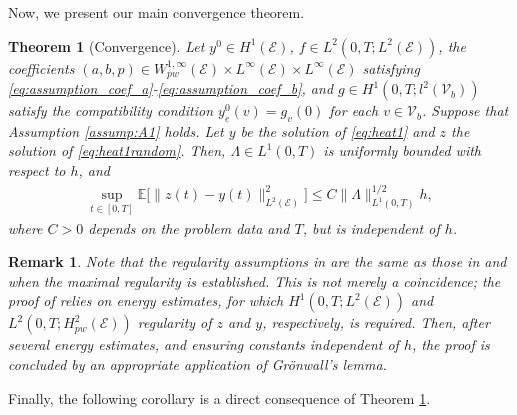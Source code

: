 \documentclass[a4paper, 10pt, english]{article}
\newtheorem{theorem}{Theorem}[section]
\newtheorem{remark}{Remark}[section]
\begin{document}
Now, we present our main convergence theorem.

\begin{theorem}[Convergence]\label{th:convergence}
Let $y^0 \in H^1(\mathcal{E})$, $f \in L^2(0, T; L^2(\mathcal{E}))$, the coefficients $(a, b, p) \in W^{1,\infty}_{pw}(\mathcal{E}) \times L^\infty(\mathcal{E}) \times L^\infty(\mathcal{E})$ satisfying \eqref{eq:assumption_coef_a}-\eqref{eq:assumption_coef_b}, and $g \in H^1(0, T; l^2(\mathcal{V}_b))$ satisfy the compatibility condition $y^0_e(v) = g_v(0)$ for each $v \in \mathcal{V}_b$. Suppose that Assumption \ref{assump:A1} holds. Let $y$ be the solution of \eqref{eq:heat1} and $z$ the solution of \eqref{eq:heat1random}. Then, $\Lambda\in L^1(0,T)$ is uniformly bounded with respect to $h$, and
    \begin{align*}
        \sup_{t \in [0, T]} \mathbb{E}\big[\|z(t) - y(t)\|^2_{L^2(\mathcal{E})}\big] \leq C \|\Lambda\|_{L^1(0, T)}^{1/2} h,
    \end{align*}
    where $C > 0$ depends on the problem data and $T$, but is independent of $h$.
\end{theorem}


\begin{remark}
  Note that the regularity assumptions in  are the same as those in  and  when the maximal regularity is established. This is not merely a coincidence; the proof of  relies on energy estimates, for which $H^1(0,T;L^2(\mathcal{E}))$ and $L^2(0,T;H^2_{pw}(\mathcal{E}))$ regularity of $z$ and $y$, respectively, is required. Then, after several energy estimates, and ensuring constants independent of $h$, the proof is concluded by an appropriate application of Gr\"onwall's lemma.
\end{remark}
Finally, the following corollary is a direct consequence of Theorem \ref{th:convergence}.
\end{document}
